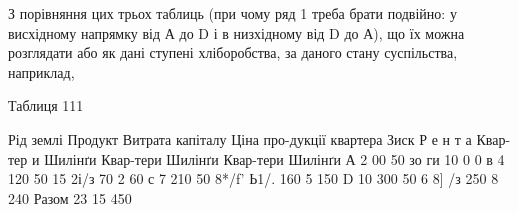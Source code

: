 З порівняння цих трьох таблиць (при чому ряд 1 треба брати подвійно:
у висхідному напрямку від А до D і в низхідному від D до А), що їх можна
розглядати або як дані ступені хліборобства, за даного стану суспільства, наприклад,

Таблиця 111

Рід  землі    Продукт        Витрата  капіталу    Ціна про-дукції квартера    Зиск        Р е    н т
а
    Квар-тер и    Шилінґи            Квар-тери    Шилінґи    Квар-тери    Шилінґи
А    2    00    50    зо    ги    10    0    0
в    4    120    50    15    2і/з    70    2    60
с    7    210    50    8*/f'    Ь1/.    160    5    150
D    10    300    50    6    8] /з    250    8    240
Разом 23                            15    450
